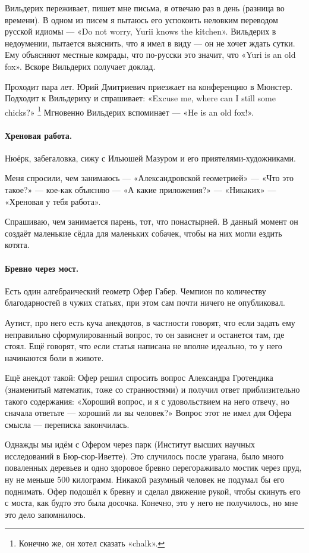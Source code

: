 \documentclass{book}
\begin{document}
Вильдерих переживает, пишет мне письма, я отвечаю раз в день (разница во времени).
В одном из писем я пытаюсь его успокоить неловким переводом русской идиомы --- «Do not worry, Yurii knows the kitchen».
Вильдерих в недоумении, пытается выяснить, что я имел в виду --- он не хочет ждать сутки.
Ему объясняют местные комрады, что по-русски это значит, что «Yuri is an old fox».
Вскоре Вильдерих получает доклад.

Проходит пара лет.
Юрий Дмитриевич приезжает на конференцию в Мюнстер.
Подходит к Вильдериху и спрашивает: «Excuse me, where can I still some chicks?»%
\footnote{Конечно же, он хотел сказать «chalk».}
Мгновенно Вильдерих вспоминает --- «He is an old fox!».

\paragraph{Хреновая работа.}
Нюёрк, забегаловка, сижу с Ильюшей Мазуром и его приятелями-художниками.

Меня спросили, чем занимаюсь --- «Александровской геометрией» --- «Что это такое?» --- кое-как объясняю --- «А какие приложения?» --- «Никаких» --- «Хреновая у тебя работа».

Спрашиваю, чем занимается парень, тот, что понастырней.
В данный момент он создаёт маленькие сёдла для маленьких собачек, чтобы на них могли ездить котята.

\paragraph{Бревно через мост.}
Есть один алгебраический геометр Офер Габер.
Чемпион по количеству благодарностей в чужих статьях, при этом сам почти ничего не опубликовал.

Аутист, про него есть куча анекдотов, в частности говорят, что если задать ему неправильно сформулированный вопрос, то он зависнет и останется там, где стоял.
Ещё говорят, что если статья написана не вполне идеально, то у него начинаются боли в животе.

Ещё анекдот такой: Офер решил спросить вопрос Александра Гротендика (знаменитый математик, тоже со странностями) и получил ответ приблизительно такого содержания: «Хороший вопрос, и я с удовольствием на него отвечу, но сначала ответьте --- хороший ли вы человек?»
Вопрос этот не имел для Офера смысла --- переписка закончилась.

Однажды мы идём с Офером через парк (Институт высших научных исследований в Бюр-сюр-Иветте).
Это случилось после урагана, было много поваленных деревьев и одно здоровое бревно перегораживало мостик через пруд,
ну не меньше 500 килограмм.
Никакой разумный человек не подумал бы его поднимать.
Офер подошёл к бревну и сделал движение рукой, чтобы скинуть его с моста, как будто это была досочка.
Конечно, это у него не получилось, но мне это дело запомнилось.
\end{document}
